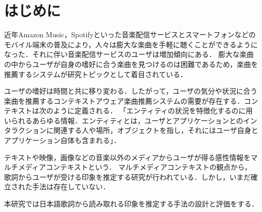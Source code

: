 \documentclass[a4paper,10pt,twocolumn]{jsarticle}
\begin{document}
\section{はじめに}
近年Amazon Music，Spotifyといった音楽配信サービスとスマートフォンなどのモバイル端末の普及により，人々は膨大な楽曲を手軽に聴くことができるようになった．それに伴い音楽配信サービスのユーザは増加傾向にある．
膨大な楽曲の中からユーザが自身の嗜好に合う楽曲を見つけるのは困難であるため，楽曲を推薦するシステムが研究トピックとして着目されている．

ユーザの嗜好は時間と共に移り変わる．したがって，ユーザの気分や状況に合う楽曲を推薦するコンテキストアウェア楽曲推薦システムの需要が存在する．コンテキストは次のように定義される．
「エンティティの状況を特徴化するのに用いられるあらゆる情報．エンティティとは，ユーザとアプリケーションとのインタラクションに関連する人や場所，オブジェクトを指し，それにはユーザ自身とアプリケーション自体も含まれる」\cite{2}．

テキストや映像，画像などの音楽以外のメディアからユーザが得る感性情報をマルチメディアコンテキストという．
マルチメディアコンテキストの観点から，歌詞からユーザが受ける印象を推定する研究が行われている．しかし，いまだ確立された手法は存在していない．

本研究では日本語歌詞から読み取れる印象を推定する手法の設計と評価をする．
%
\end{document}
